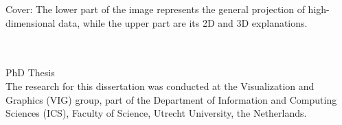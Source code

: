 \thispagestyle{empty}

\hyphenation{}

\null
\vfill

\noindent Cover: The lower part of the image represents the general projection of high-dimensional data, while the upper part are its 2D and 3D explanations.
\vspace{1.5cm}

\noindent \myTitle\\

\noindent \myName\\
PhD Thesis\\

\vspace{1.5cm}
\noindent The research for this dissertation was conducted at the Visualization and Graphics (VIG) group, part of the Department of Information and Computing Sciences (ICS), Faculty of Science, Utrecht University, the Netherlands. \\

\vspace{1.5cm}


